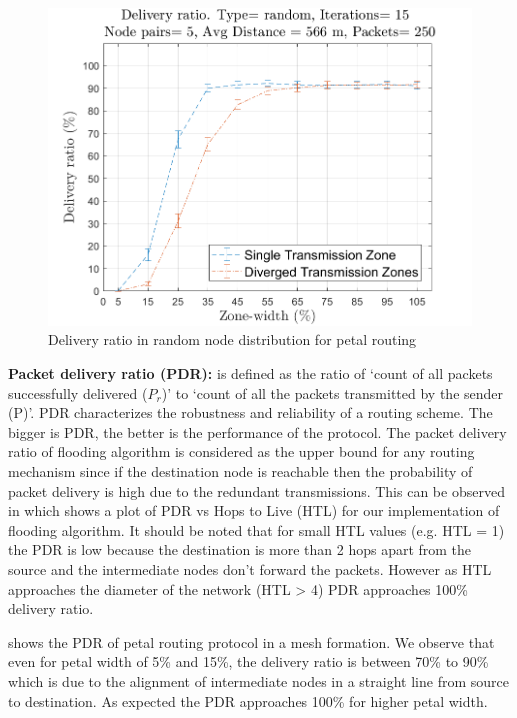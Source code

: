 \begin{figure}[hbtp]
\centering
\includegraphics[width=\simResultFigSize \textwidth]{ncsuthesis-0.6/Chapter-5/figs/pe_DR_random.png}
\caption{Delivery ratio in random node distribution for petal routing}
\label{fig:pe_DR_random}
\end{figure}

\textbf{Packet delivery ratio (PDR):} is defined as the ratio of `count of all packets successfully delivered ($P_r$)' to `count of all the packets transmitted by the sender (P)'. PDR characterizes the robustness and reliability of a routing scheme. The bigger is PDR, the better is the performance of the protocol. 
The packet delivery ratio of flooding algorithm is considered as the upper bound for any routing mechanism since if the destination node is reachable then the probability of packet delivery is high due to the redundant transmissions. This can be observed in  which shows a plot of PDR vs Hops to Live (HTL) for our implementation of flooding algorithm. It should be noted that for small HTL values (e.g. HTL = 1) the PDR is low because the destination is more than 2 hops apart from the source and the intermediate nodes don't forward the packets. However as HTL approaches the diameter of the network (HTL > 4) PDR approaches 100\% delivery ratio. 

 shows the PDR of petal routing protocol in a mesh formation. We observe that even for petal width of 5\% and 15\%, the delivery ratio is between 70\% to 90\% which is due to the alignment of intermediate nodes in a straight line from source to destination. As expected the PDR approaches 100\% for higher petal width.

